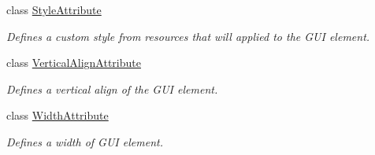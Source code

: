 \begin{DoxyCompactItemize}
class \mbox{\hyperlink{class_wpf_handler_1_1_u_i_1_1_auto_layout_1_1_options_1_1_style_attribute}{Style\+Attribute}}
\begin{DoxyCompactList}\small\item\em Defines a custom style from resources that will applied to the G\+UI element. \end{DoxyCompactList}\item 
class \mbox{\hyperlink{class_wpf_handler_1_1_u_i_1_1_auto_layout_1_1_options_1_1_vertical_align_attribute}{Vertical\+Align\+Attribute}}
\begin{DoxyCompactList}\small\item\em Defines a vertical align of the G\+UI element. \end{DoxyCompactList}\item 
class \mbox{\hyperlink{class_wpf_handler_1_1_u_i_1_1_auto_layout_1_1_options_1_1_width_attribute}{Width\+Attribute}}
\begin{DoxyCompactList}\small\item\em Defines a width of G\+UI element. \end{DoxyCompactList}\end{DoxyCompactItemize}
